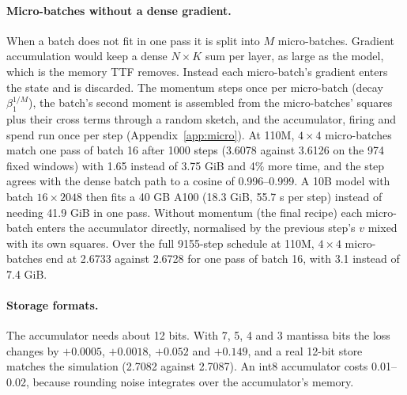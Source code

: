 \documentclass[10pt,twocolumn]{article}
\begin{document}
\paragraph{Micro-batches without a dense gradient.} When a batch does not fit in one pass it is split into $M$
micro-batches. Gradient accumulation would keep a dense $N\times K$ sum per layer, as large as the model, which is the
memory TTF removes. Instead each micro-batch's gradient enters the state and is discarded. The momentum steps once per
micro-batch (decay $\beta_1^{1/M}$), the batch's second moment is assembled from the micro-batches' squares plus their
cross terms through a random sketch, and the accumulator, firing and spend run once per step
(Appendix~\ref{app:micro}). At 110M, $4\times4$ micro-batches match one pass of batch 16 after 1000 steps (3.6078
against 3.6126 on the 974 fixed windows) with 1.65 instead of 3.75 GiB and 4\% more time, and the step agrees with the
dense batch path to a cosine of 0.996--0.999. A 10B model with batch $16\times2048$ then fits a 40 GB A100 (18.3 GiB, 55.7 s per step)
instead of needing 41.9 GiB in one pass. Without momentum (the final recipe) each micro-batch enters the accumulator
directly, normalised by the previous step's $v$ mixed with its own squares. Over the full 9155-step schedule at 110M,
$4\times4$ micro-batches end at 2.6733 against 2.6728 for one pass of batch 16, with 3.1 instead of 7.4 GiB.

\paragraph{Storage formats.} The accumulator needs about 12 bits. With 7, 5, 4 and 3 mantissa bits the loss changes by
$+0.0005$, $+0.0018$, $+0.052$ and $+0.149$, and a real 12-bit store matches the simulation (2.7082 against 2.7087). An
int8 accumulator costs 0.01--0.02, because rounding noise integrates over the accumulator's memory.
\end{document}
